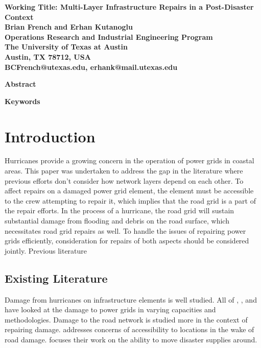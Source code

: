 \documentclass[10pt]{article}
\begin{document}
\newpage
\thispagestyle{empty}
\begin{center}
{\Large \textbf{ Working Title: Multi-Layer Infrastructure Repairs in a Post-Disaster Context}} \\
\vspace*{0.2cm}
{\large \textbf{Brian French and Erhan Kutanoglu}} \\
{\large \textbf{Operations Research and Industrial Engineering Program}} \\
{\large \textbf{The University of Texas at Austin}} \\
{\large \textbf{Austin, TX 78712, USA}} \\
{\large \textbf{BCFrench@utexas.edu, erhank@mail.utexas.edu}} \\
\end{center}

\thispagestyle{empty}
\begin{center}
{\large \bf Abstract}
\end{center}

\vspace*{-12pt}


{\large \bf Keywords}\\


\vspace*{-12pt}
\section{{\large Introduction}}
\label{sec:ic:intro}
\vspace*{-12pt}

Hurricanes provide a growing concern in the operation of power grids in coastal areas. This paper was undertaken to address the gap in the literature where previous efforts don't consider how network layers depend on each other. To affect  repairs on a damaged power grid element, the element must be accessible to the crew attempting to repair it, which implies that the road grid is a part of the repair efforts. In the process of a hurricane, the road grid will sustain substantial damage from flooding and debris on the road surface, which necessitates road grid repairs as well. To handle the issues of repairing power grids efficiently, consideration for repairs of both aspects should be considered jointly. Previous literature 

\subsection{\large Existing Literature}
\vspace*{-12pt}
Damage from hurricanes on infrastructure elements is well studied. All of \cite{WinklerEA2010}, \cite{ScherbEA2015}, and \cite{GuikemaEA2010} have looked at the damage to power grids in varying capacities and methodologies. Damage to the road network is studied more in the context of repairing damage. \cite{AksuEA2014} addresses concerns of accessibility to locations in the wake of road damage. \cite{DuqueEA2016} focuses their work on the ability to move disaster supplies around.
\end{document}
